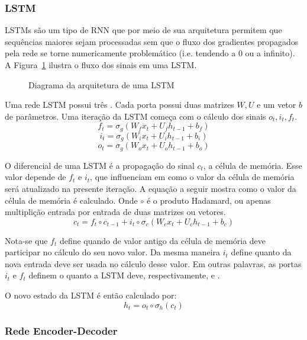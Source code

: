 \subsubsection{LSTM}
\label{sec:lstm}

LSTMs \citep{lstm} são um tipo de RNN que por meio de sua arquitetura permitem que sequências
maiores sejam processadas sem que o fluxo dos gradientes propagados pela rede se torne
numericamente problemático (i.e. tendendo a 0 ou a infinito). A Figura~\ref{fig:lstm} ilustra o fluxo dos sinais em uma LSTM. \\
\begin{figure}
\centering
\caption{Diagrama da arquitetura de uma LSTM}

\label{fig:lstm}
\end{figure}


Uma rede LSTM possui três . Cada porta possui duas matrizes $W,U$ e um
vetor $b$ de parâmetros. Uma iteração da LSTM começa com o cálculo dos sinais
$o_t,i_t,f_t$.\\

\[f_t = \sigma_g(W_fx_t + U_fh_{t-1} + b_f)\]
\[i_t = \sigma_g(W_ix_t + U_ih_{t-1} + b_i)\]
\[o_t = \sigma_g(W_ox_t + U_oh_{t-1} + b_o)\]

O diferencial de uma LSTM é a propagação do sinal $c_t$, a célula de memória.
Esse valor depende de $f_t$ e $i_t$, que influenciam em como o valor da
célula de memória será atualizado na presente iteração. A equação a seguir
mostra como o valor da célula de memória é calculado. Onde $\circ$ é o produto Hadamard, ou apenas multiplição entrada por entrada de
duas matrizes ou vetores. \\

\[c_t = f_t \circ c_{t-1} + i_t \circ \sigma_c(W_cx_t + U_ch_{t-1} + b_c)\]

Nota-se que $f_t$
define quando de valor antigo da célula de memória deve participar no cálculo do
seu novo valor. 
Da mesma maneira $i_t$ define quanto da nova entrada deve ser usada no cálculo desse valor.
Em outras palavras, as portas $i_t$ e $f_t$ definem o quanto a LSTM deve,
respectivamente,  e .


O novo estado da LSTM é então calculado por: \\
\[h_t = o_t \circ \sigma_h(c_t)\]




\subsubsection{Rede Encoder-Decoder}

